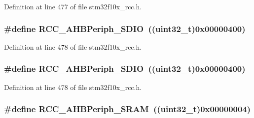 Definition at line 477 of file stm32f10x\+\_\+rcc.\+h.

\subsubsection[{\texorpdfstring{R\+C\+C\+\_\+\+A\+H\+B\+Periph\+\_\+\+S\+D\+IO}{RCC_AHBPeriph_SDIO}}]{\setlength{\rightskip}{0pt plus 5cm}\#define R\+C\+C\+\_\+\+A\+H\+B\+Periph\+\_\+\+S\+D\+IO~(({\bf uint32\+\_\+t})0x00000400)}\hypertarget{group___a_h_b__peripheral_gaa2664a55eedcedff22532982ae753566}{}\label{group___a_h_b__peripheral_gaa2664a55eedcedff22532982ae753566}


Definition at line 478 of file stm32f10x\+\_\+rcc.\+h.

\subsubsection[{\texorpdfstring{R\+C\+C\+\_\+\+A\+H\+B\+Periph\+\_\+\+S\+D\+IO}{RCC_AHBPeriph_SDIO}}]{\setlength{\rightskip}{0pt plus 5cm}\#define R\+C\+C\+\_\+\+A\+H\+B\+Periph\+\_\+\+S\+D\+IO~(({\bf uint32\+\_\+t})0x00000400)}\hypertarget{group___a_h_b__peripheral_gaa2664a55eedcedff22532982ae753566}{}\label{group___a_h_b__peripheral_gaa2664a55eedcedff22532982ae753566}


Definition at line 478 of file stm32f10x\+\_\+rcc.\+h.

\subsubsection[{\texorpdfstring{R\+C\+C\+\_\+\+A\+H\+B\+Periph\+\_\+\+S\+R\+AM}{RCC_AHBPeriph_SRAM}}]{\setlength{\rightskip}{0pt plus 5cm}\#define R\+C\+C\+\_\+\+A\+H\+B\+Periph\+\_\+\+S\+R\+AM~(({\bf uint32\+\_\+t})0x00000004)}\hypertarget{group___a_h_b__peripheral_ga8aec305b766b1c0ae297f8e1be103bd1}{}\label{group___a_h_b__peripheral_ga8aec305b766b1c0ae297f8e1be103bd1}


